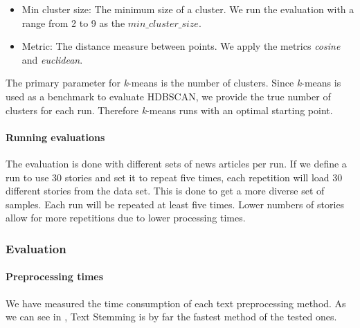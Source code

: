 \begin{itemize}
    \item Min cluster size: The minimum size of a cluster.
          We run the evaluation with a range from 2 to 9 as the $min\_cluster\_size$.
    \item Metric: The distance measure between points.
          We apply the metrics \textit{cosine} and \textit{euclidean}.
\end{itemize}

The primary parameter for \textit{k}-means is the number of clusters.
Since \textit{k}-means is used as a benchmark to evaluate HDBSCAN, we provide the true number of clusters for each run.
Therefore \textit{k}-means runs with an optimal starting point.

\paragraph{Running evaluations}
The evaluation is done with different sets of news articles per run.
If we define a run to use 30 stories and set it to repeat five times,
each repetition will load 30 different stories from the data set.
This is done to get a more diverse set of samples.
Each run will be repeated at least five times.
Lower numbers of stories allow for more repetitions due to lower processing times.

\subsubsection{Evaluation}
\label{subsubsec:5a_evaluation}

\paragraph{Preprocessing times}
We have measured the time consumption of each text preprocessing method.
As we can see in , Text Stemming is by far the fastest method of the tested ones.

\begin{table}[h]
    \centering
    \caption{Comparison of text preprocessing times.}
    \label{tab:preprocessing_times}
\end{table}

